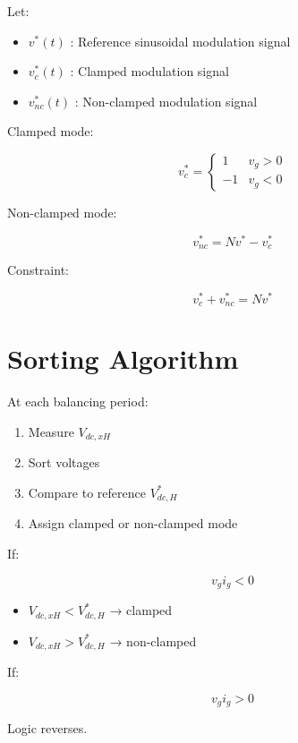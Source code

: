 \documentclass[11pt]{article}
\begin{document}
Let:

\begin{itemize}
\item $v^*(t)$ : Reference sinusoidal modulation signal
\item $v_c^*(t)$ : Clamped modulation signal
\item $v_{nc}^*(t)$ : Non-clamped modulation signal
\end{itemize}

Clamped mode:

\begin{equation}
v_c^* =
\begin{cases}
1 & v_g > 0 \\
-1 & v_g < 0
\end{cases}
\end{equation}

Non-clamped mode:

\begin{equation}
v_{nc}^* = N v^* - v_c^*
\end{equation}

Constraint:

\begin{equation}
v_c^* + v_{nc}^* = N v^*
\end{equation}

\section{Sorting Algorithm}

At each balancing period:

\begin{enumerate}
\item Measure $V_{dc,xH}$
\item Sort voltages
\item Compare to reference $V_{dc,H}^*$
\item Assign clamped or non-clamped mode
\end{enumerate}

If:

\[
v_g i_g < 0
\]

\begin{itemize}
\item $V_{dc,xH} < V_{dc,H}^*$ → clamped
\item $V_{dc,xH} > V_{dc,H}^*$ → non-clamped
\end{itemize}

If:

\[
v_g i_g > 0
\]

Logic reverses.
\end{document}
